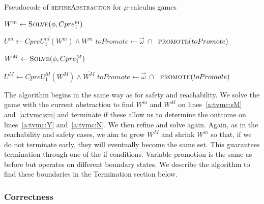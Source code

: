 \begin{algorithm}

\caption{Pseudocode of \textsc{refineAbstraction} for $\mu$-calculus games}
\label{alg:muRefineAbstraction}

\begin{algorithmic}[1]

 \label{a:mu:nu}

\State $W^m \gets \textsc{Solve}(\phi, Cpre_1^m)$ \label{a:mu:win}

    \State $U^m \gets \overline{CpreU_1^{m}(W^m)} \land W^m$ \label{a:mu:cpre}
     \label{a:mu:pri}
            \State $toPromote \gets \vec{\omega}~\cap~$
            \State $\Call{promote}{toPromote}$
        \Else
            \State {} \label{a:mu:recurse}
        \EndIf


        \State $W^M \gets \textsc{Solve}(\phi, Cpre_1^M)$

        \State $U^M \gets CpreU_1^{M}(W^M) \land \overline{W^M}$
            \State $toPromote \gets \vec{\omega}~\cap~$
            \State $\Call{promote}{toPromote}$
        \Else
            \State {}
        \EndIf

    \EndIf
\EndFunction
\end{algorithmic}
\end{algorithm}

The algorithm begins in the same way as for safety and reachability. We solve the game with the current abstraction to find $W^m$ and $W^M$ on lines~\ref{a:tvmc:sM} and~\ref{a:tvmc:sm} and terminate if these allow us to determine the outcome on lines~\ref{a:tvmc:Y} and~\ref{a:tvmc:N}. We then refine and solve again. Again, as in the reachability and safety cases, we aim to grow $W^M$ and shrink $W^m$ so that, if we do not terminate early, they will eventually become the same set. This guarantees termination through one of the if conditions. Variable promotion is the same as before but operates on different boundary states. We describe the algorithm to find these boundaries in the Termination section below. 

\subsubsection{Correctness}

